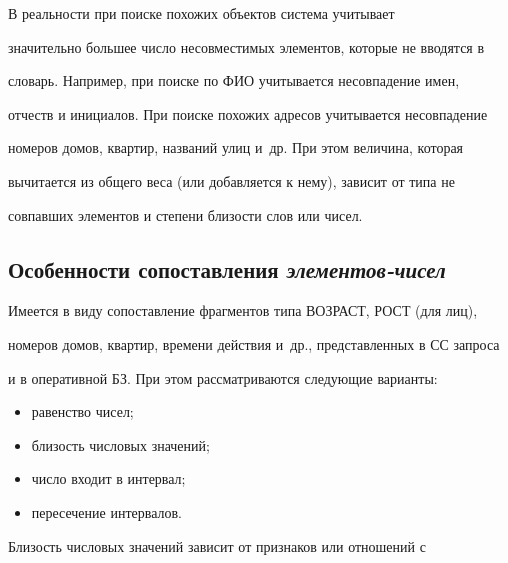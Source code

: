     


    В реальности при поиске похожих объектов система учитывает 


значительно большее число несовместимых элементов, которые не вводятся в 


словарь. Например, при поиске по ФИО учитывается несовпадение имен, 


отчеств и инициалов. При поиске похожих адресов учитывается несовпадение 


номеров домов, квартир, названий улиц и~др. При этом величина, которая 


вычитается из общего веса (или добавляется к нему), зависит от типа не 


совпавших элементов и степени близости слов или чисел. 


    


    \subsection{Особенности сопоставления \textit{элементов-чисел}} 


    


Имеется в виду сопоставление фрагментов типа ВОЗРАСТ, РОСТ (для лиц), 


номеров домов, квартир, времени действия и~др., представленных в СС запроса 


и в оперативной БЗ. При этом рассматриваются следующие варианты:


    \begin{itemize}


    \item равенство чисел;\\[-14pt]


    \item близость числовых значений;\\[-14pt]


    \item число входит в интервал;\\[-14pt]


    \item пересечение интервалов.


    \end{itemize}


    


    Близость числовых значений зависит от признаков или отношений с 


